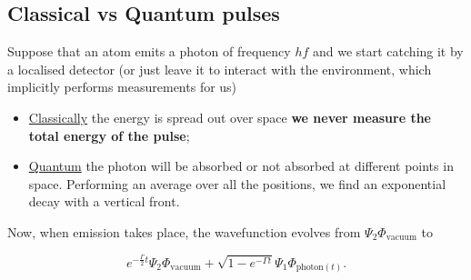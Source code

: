  \subsection{Classical vs Quantum pulses}
 Suppose that an atom  emits a photon of frequency $ hf  $ and we start
 catching it by a localised detector (or just leave it to interact with
 the environment, which implicitly performs measurements for us)
 \begin{itemize}
 \item \underline{Classically} the energy is spread out over space \ira
   \textbf{we never measure the total energy of the pulse};
 \item \underline{Quantum} the photon will  be absorbed or not absorbed
   at different  points in space.   Performing an average over  all the
   positions, we find an exponential decay with a vertical front.
 \end{itemize}

 Now,  when  emission  takes   place,  the  wavefunction  evolves  from
 $ \Psi_2\Phi_{\text{vacuum}} $ to

 \begin{equation}
   e^{-\frac{\Gamma}{2}t}\Psi_2\Phi_{\text{vacuum}} + \sqrt{1-e^{-\Gamma t}}\Psi_1\Phi_{\text{photon}(t)}.
 \end{equation}

